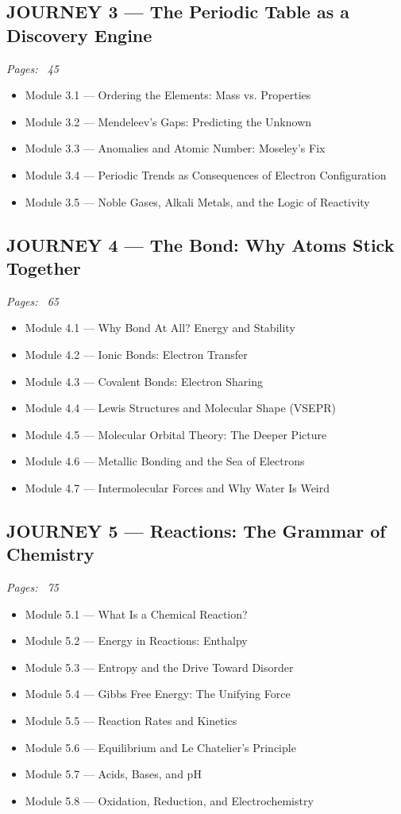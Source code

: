 \documentclass{article}
\begin{document}
\subsection*{JOURNEY 3 — The Periodic Table as a Discovery Engine}
\textit{Pages: ~45}

\begin{itemize}
    \item Module 3.1 — Ordering the Elements: Mass vs. Properties
    \item Module 3.2 — Mendeleev's Gaps: Predicting the Unknown
    \item Module 3.3 — Anomalies and Atomic Number: Moseley's Fix
    \item Module 3.4 — Periodic Trends as Consequences of Electron Configuration
    \item Module 3.5 — Noble Gases, Alkali Metals, and the Logic of Reactivity
\end{itemize}

\subsection*{JOURNEY 4 — The Bond: Why Atoms Stick Together}
\textit{Pages: ~65}

\begin{itemize}
    \item Module 4.1 — Why Bond At All? Energy and Stability
    \item Module 4.2 — Ionic Bonds: Electron Transfer
    \item Module 4.3 — Covalent Bonds: Electron Sharing
    \item Module 4.4 — Lewis Structures and Molecular Shape (VSEPR)
    \item Module 4.5 — Molecular Orbital Theory: The Deeper Picture
    \item Module 4.6 — Metallic Bonding and the Sea of Electrons
    \item Module 4.7 — Intermolecular Forces and Why Water Is Weird
\end{itemize}

\subsection*{JOURNEY 5 — Reactions: The Grammar of Chemistry}
\textit{Pages: ~75}

\begin{itemize}
    \item Module 5.1 — What Is a Chemical Reaction?
    \item Module 5.2 — Energy in Reactions: Enthalpy
    \item Module 5.3 — Entropy and the Drive Toward Disorder
    \item Module 5.4 — Gibbs Free Energy: The Unifying Force
    \item Module 5.5 — Reaction Rates and Kinetics
    \item Module 5.6 — Equilibrium and Le Chatelier's Principle
    \item Module 5.7 — Acids, Bases, and pH
    \item Module 5.8 — Oxidation, Reduction, and Electrochemistry
\end{itemize}
\end{document}
